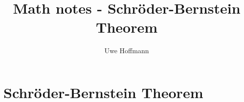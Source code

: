 


\title{Math notes - Schr\"oder-Bernstein Theorem}
\author{Uwe Hoffmann}



\setcounter{chapter}{0}
\chapter{Schr\"oder-Bernstein Theorem}
